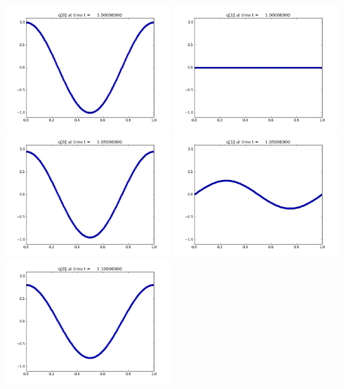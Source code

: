 \documentclass[11pt]{article}
\begin{document}
\vskip 10pt 
\includegraphics[width=0.475\textwidth]{frame0020fig0.png}
\includegraphics[width=0.475\textwidth]{frame0020fig1.png}
\vskip 10pt 
\includegraphics[width=0.475\textwidth]{frame0021fig0.png}
\includegraphics[width=0.475\textwidth]{frame0021fig1.png}
\vskip 10pt 
\includegraphics[width=0.475\textwidth]{frame0022fig0.png}
\end{document}
